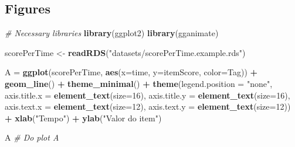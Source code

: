 \documentclass[]{article}
\title{}
\author{}
\date{}
\newenvironment{Shaded}{\begin{snugshade}}{\end{snugshade}}
\newcommand{\CommentTok}[1]{\textcolor[rgb]{0.56,0.35,0.01}{\textit{#1}}}
\newcommand{\DataTypeTok}[1]{\textcolor[rgb]{0.13,0.29,0.53}{#1}}
\newcommand{\DecValTok}[1]{\textcolor[rgb]{0.00,0.00,0.81}{#1}}
\newcommand{\KeywordTok}[1]{\textcolor[rgb]{0.13,0.29,0.53}{\textbf{#1}}}
\newcommand{\NormalTok}[1]{#1}
\newcommand{\OperatorTok}[1]{\textcolor[rgb]{0.81,0.36,0.00}{\textbf{#1}}}
\newcommand{\StringTok}[1]{\textcolor[rgb]{0.31,0.60,0.02}{#1}}
\begin{document}
\hypertarget{figures}{%
\subsection{Figures}\label{figures}}

\begin{Shaded}
\begin{Highlighting}[]
\CommentTok{# Necessary libraries}
\KeywordTok{library}\NormalTok{(ggplot2)}
\KeywordTok{library}\NormalTok{(gganimate)}
\end{Highlighting}
\end{Shaded}

\begin{Shaded}
\begin{Highlighting}[]
\NormalTok{scorePerTime <-}\StringTok{ }\KeywordTok{readRDS}\NormalTok{(}\StringTok{"datasets/scorePerTime.example.rds"}\NormalTok{)}
\end{Highlighting}
\end{Shaded}

\begin{Shaded}
\begin{Highlighting}[]
\NormalTok{A =}\StringTok{ }\KeywordTok{ggplot}\NormalTok{(scorePerTime, }\KeywordTok{aes}\NormalTok{(}\DataTypeTok{x=}\NormalTok{time, }\DataTypeTok{y=}\NormalTok{itemScore, }\DataTypeTok{color=}\NormalTok{Tag)) }\OperatorTok{+}\StringTok{ }\KeywordTok{geom_line}\NormalTok{() }\OperatorTok{+}
\StringTok{  }\KeywordTok{theme_minimal}\NormalTok{() }\OperatorTok{+}\StringTok{ }\KeywordTok{theme}\NormalTok{(}\DataTypeTok{legend.position =} \StringTok{"none"}\NormalTok{, }\DataTypeTok{axis.title.x =} \KeywordTok{element_text}\NormalTok{(}\DataTypeTok{size=}\DecValTok{16}\NormalTok{),}
                          \DataTypeTok{axis.title.y =} \KeywordTok{element_text}\NormalTok{(}\DataTypeTok{size=}\DecValTok{16}\NormalTok{),}
                          \DataTypeTok{axis.text.x =} \KeywordTok{element_text}\NormalTok{(}\DataTypeTok{size=}\DecValTok{12}\NormalTok{),}
                          \DataTypeTok{axis.text.y =} \KeywordTok{element_text}\NormalTok{(}\DataTypeTok{size=}\DecValTok{12}\NormalTok{)) }\OperatorTok{+}
\StringTok{  }\KeywordTok{xlab}\NormalTok{(}\StringTok{"Tempo"}\NormalTok{) }\OperatorTok{+}\StringTok{ }\KeywordTok{ylab}\NormalTok{(}\StringTok{"Valor do item"}\NormalTok{)}

\NormalTok{A }\CommentTok{# Do plot A}
\end{Highlighting}
\end{Shaded}
\end{document}
